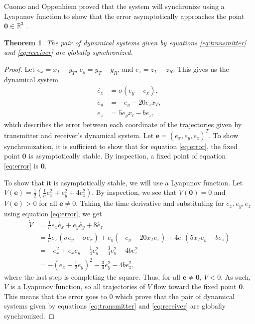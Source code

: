 \documentclass[12pt]{article}
\newtheorem{theorem}{Theorem}[section]
\begin{document}
    Cuomo and Oppenhiem proved that the system will synchronize using a Lyapunov function to show that the error asymptotically approaches the point $\mathbf{0} \in \mathbb{R}^3$ \cite{cuomo1993}. 
      \begin{theorem}
        The pair of dynamical systems given by equations \ref{eq:transmitter} and \ref{eq:receiver} are globally synchronized. 
      \end{theorem}
      \begin{proof} 
       Let $e_x = x_T - y_T$, $e_y = y_T - y_R$, and $e_z = z_T - z_R$. This gives us the dynamical system 
       \begin{equation}\label{eq:error}
        \begin{aligned}
         \dot{e_x} &= \sigma (e_y - e_x), \\ 
         \dot{e_y} &= -e_y - 20e_z x_T, \\
         \dot{e_z} &= 5e_y x_t - be_z,  
        \end{aligned} 
       \end{equation}
       which describes the error between each coordinate of the trajectories given by transmitter and receiver's dynamical system. Let $\mathbf{e} = (e_x,e_y,e_z)^T$. To show synchronization, it is sufficient to show that for equation \ref{eq:error}, the fixed point $\mathbf{0}$ is asymptotically stable. By inspection, a fixed point of equation \ref{eq:error} is $\mathbf{0}$. 
       
       To show that it is asymptotically stable, we will use a Lyapunov function. Let $V(\mathbf{e}) = \frac{1}{2} \left( \frac{1}{\sigma} e_x^2 + e_y^2 + 4e_z^2 \right)$. By inspection, we see that $V(\mathbf{0}) = 0$ and $V(\mathbf{e}) > 0$ for all $\mathbf{e} \neq 0$. Taking the time derivative and substituting for $e_x,e_y,e_z$ using equation \ref{eq:error}, we get 
       \begin{align*} 
         \dot{V} &= \frac{1}{\sigma} e_x \dot{e_x} + e_y \dot{e_y} + 8 \dot{e_z} \\
         &= \frac{1}{\sigma} e_x (\sigma e_y - \sigma e_x) + e_y (-e_y - 20x_T e_z) + 4 e_z (5x_T e_y - be_z) \\ 
         &= -e_x^2 + e_x e_y - \frac{1}{4} e_y^2 - \frac{3}{4} e_y^2 - 4be_z^2 \\
         &= - \left( e_x - \frac{1}{2}e_y \right)^2 - \frac{3}{4} e_y^2 - 4be_z^2,
       \end{align*}
       where the last step is completing the square. Thus, for all $\mathbf{e} \neq \mathbf{0}$, $\dot{V} < 0$. As such, $V$ is a Lyapunov function, so all trajectories of $V$ flow toward the fixed point $\mathbf{0}$. This means that the error goes to $0$ which prove that the pair of dynamical systems given by equations \ref{eq:transmitter} and \ref{eq:receiver} are globally synchronized.
      \end{proof}
\end{document}
